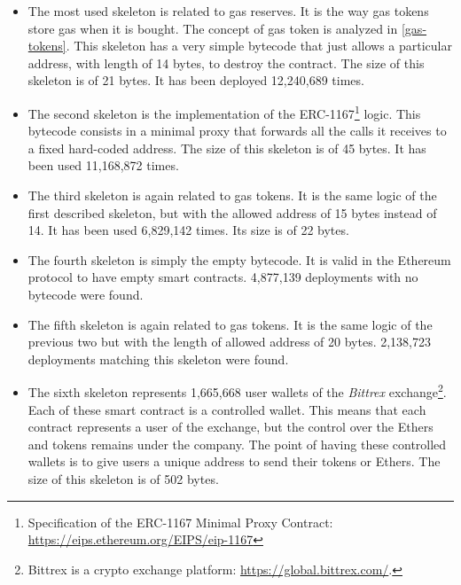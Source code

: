 \begin{itemize}

    \item The most used skeleton is related to gas reserves. It is the way gas tokens store gas when it is bought. The concept of gas token is analyzed in \cref{gas-tokens}. This skeleton has a very simple bytecode that just allows a particular address, with length of 14 bytes, to destroy the contract. The size of this skeleton is of 21 bytes. It has been deployed 12,240,689 times.
    
    \item The second skeleton is the implementation of the ERC-1167\footnote{Specification of the ERC-1167 Minimal Proxy Contract: \url{https://eips.ethereum.org/EIPS/eip-1167}} logic. This bytecode consists in a minimal proxy that forwards all the calls it receives to a fixed hard-coded address. The size of this skeleton is of 45 bytes. It has been used 11,168,872 times.

    \item The third skeleton is again related to gas tokens. It is the same logic of the first described skeleton, but with the allowed address of 15 bytes instead of 14. It has been used 6,829,142 times. Its size is of 22 bytes.

    \item The fourth skeleton is simply the empty bytecode. It is valid in the Ethereum protocol to have empty smart contracts. 4,877,139 deployments with no bytecode were found.

    \item The fifth skeleton is again related to gas tokens. It is the same logic of the previous two but with the length of allowed address of 20 bytes. 2,138,723 deployments matching this skeleton were found.

    \item The sixth skeleton represents 1,665,668 user wallets of the \textit{Bittrex} exchange\footnote{Bittrex is a crypto exchange platform: \url{https://global.bittrex.com/}.}. Each of these smart contract is a controlled wallet. This means that each contract represents a user of the exchange, but the control over the Ethers and tokens remains under the company. The point of having these controlled wallets is to give users a unique address to send their tokens or Ethers. The size of this skeleton is of 502 bytes.


\end{itemize}
